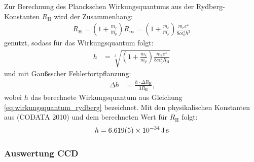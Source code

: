 \documentclass[11pt, a4paper]{article}
\numberwithin{equation}{section}
\begin{document}
Zur Berechnung des Planckschen Wirkungsquantums aus der Rydberg-Konstanten $R_\mathrm{H}$ wird der Zusammenhang:
\begin{align*}
	R_\mathrm{H} = \left( 1 + \frac{m_e}{m_p} \right) R_\infty = \left( 1 + \frac{m_e}{m_p} \right) \frac{m_e e^4}{8 c \epsilon_0^2 h^3}
\end{align*}
genutzt, sodass für das Wirkungsquantum folgt:
\begin{align}
	\label{eq:wirkungsquantum_rydberg}
	h &= \sqrt[3]{\left( 1 + \frac{m_e}{m_p} \right) \frac{m_e e^4}{8 c \epsilon_0^2 R_\mathrm{H}}}
\end{align}
und mit Gaußsscher Fehlerfortpflanzung:
\begin{align*}
	\Delta h &= \frac{h \cdot \Delta R_\mathrm{H}}{3 R_\mathrm{H}} \text{,}
\end{align*}
wobei $h$ das berechnete Wirkungsquantum aus Gleichung \ref{eq:wirkungsquantum_rydberg} bezeichnet.
Mit den physikalischen Konstanten aus (CODATA 2010) und dem berechneten Wert für $R_\mathrm{H}$ folgt:
\begin{align*}
	h = \SI{6.619 +- 0.005e-34}{\joule\second}
\end{align*}

\subsubsection{Auswertung CCD}
\end{document}
